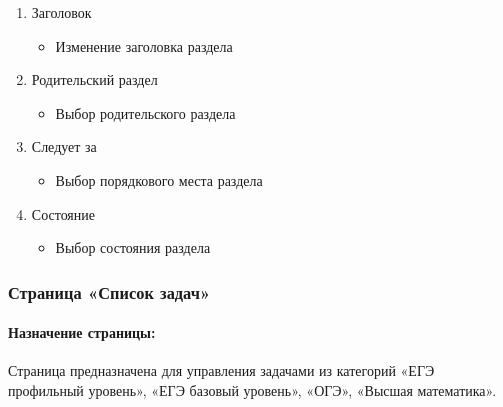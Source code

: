 \begin{enumerate}
\begin{enumerate}
\begin{enumerate}
            \item Заголовок
            \begin{itemize}
                \item Изменение заголовка раздела
            \end{itemize}

            \item Родительский раздел
            \begin{itemize}
                \item Выбор родительского раздела
            \end{itemize}

            \item Следует за
            \begin{itemize}
                \item Выбор порядкового места раздела
            \end{itemize}

            \item Состояние
            \begin{itemize}
                \item Выбор состояния раздела
            \end{itemize}

        \end{enumerate}
    \end{enumerate}
\end{enumerate}

\subsubsection{Страница «Список задач»}
\paragraph{Назначение страницы:} Страница предназначена для управления задачами из категорий «ЕГЭ профильный уровень», «ЕГЭ базовый уровень», «ОГЭ», «Высшая математика».

